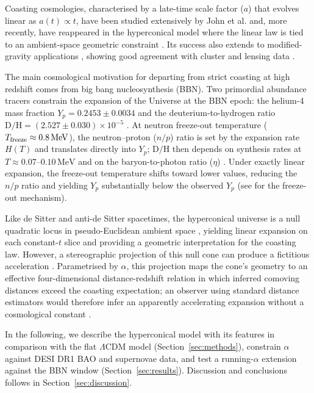 ﻿\documentclass[3p,twocolumn]{elsarticle}
\begin{document}
Coasting cosmologies, characterised by a late-time scale factor ($a$) that evolves linear as $a(t)\propto t$, have been studied extensively by John et al. \cite{john2000coasting, John2019} and, more recently, have reappeared in the hyperconical model where the linear law is tied to an ambient-space geometric constraint \cite{monjo2017hyperconical, monjo2018projected, Monjo_2023, Monjo_2024}. Its success also extends to modified-gravity applications \cite{monjo2025lensing}, showing good agreement with cluster and lensing data \cite{monjo2025lensing, monjo2025clusters}.

The main cosmological motivation for departing from strict coasting at high redshift comes from big bang nucleosynthesis (BBN). Two primordial abundance tracers constrain the expansion of the Universe at the BBN epoch: the helium-4 mass fraction $Y_p=0.2453\pm0.0034$ \cite{Aver2021} and the deuterium-to-hydrogen ratio $\mathrm{D/H}=(2.527\pm0.030)\times10^{-5}$ \cite{schoneberg2024bbn}. At neutron freeze-out temperature ($T_{\rm freeze}\approx0.8\,\mathrm{MeV}$), the neutron--proton ($n/p$) ratio is set by the expansion rate $H(T)$ and translates directly into $Y_p$; $\mathrm{D/H}$ then depends on synthesis rates at $T\approx0.07$--$0.10\,\mathrm{MeV}$ and on the baryon-to-photon ratio ($\eta$) \cite{kolbturner1990,fields2020bbn,schoneberg2024bbn}. Under exactly linear expansion, the freeze-out temperature shifts toward lower values, reducing the $n/p$ ratio and yielding $Y_p$ substantially below the observed $Y_p$ (see \cite{kolbturner1990} for the freeze-out mechanism).

Like de Sitter and anti-de Sitter spacetimes, the hyperconical universe is a null quadratic locus in pseudo-Euclidean ambient space \cite{hawking1973large, monjo2017hyperconical}, yielding linear expansion on each constant-$t$ slice and providing a geometric interpretation for the coasting law. However, a stereographic projection of this null cone can produce a fictitious acceleration \cite{Monjo_2023, Monjo_2025}. Parametrised by $\alpha$, this projection maps the cone's geometry to an effective four-dimensional distance-redshift relation in which inferred comoving distances exceed the coasting expectation; an observer using standard distance estimators would therefore infer an apparently accelerating expansion without a cosmological constant \cite{monjo2018projected, monjo2023hubble}.

In the following, we describe the hyperconical model with its features in comparison with the flat $\Lambda$CDM model (Section~\ref{sec:methods}), constrain $\alpha$ against DESI DR1 BAO and supernovae data, and test a running-$\alpha$ extension against the BBN window (Section~\ref{sec:results}). Discussion and conclusions follows in Section~\ref{sec:discussion}.
\end{document}
